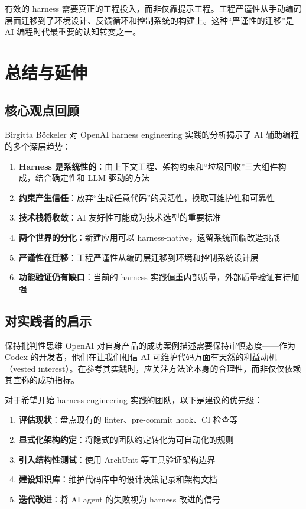 \documentclass[a4paper]{article}
\begin{document}
有效的 harness 需要真正的工程投入，而非仅靠提示工程。工程严谨性从手动编码层面迁移到了环境设计、反馈循环和控制系统的构建上。这种``严谨性的迁移''是 AI 编程时代最重要的认知转变之一。

\newpage

\section{总结与延伸}

\subsection{核心观点回顾}

Birgitta B\"{o}ckeler 对 OpenAI harness engineering 实践的分析揭示了 AI 辅助编程的多个深层趋势：

\begin{enumerate}[leftmargin=1.5em]
    \item \textbf{Harness 是系统性的}：由上下文工程、架构约束和``垃圾回收''三大组件构成，结合确定性和 LLM 驱动的方法
    \item \textbf{约束产生信任}：放弃``生成任意代码''的灵活性，换取可维护性和可靠性
    \item \textbf{技术栈将收敛}：AI 友好性可能成为技术选型的重要标准
    \item \textbf{两个世界的分化}：新建应用可以 harness-native，遗留系统面临改造挑战
    \item \textbf{严谨性在迁移}：工程严谨性从编码层迁移到环境和控制系统设计层
    \item \textbf{功能验证仍有缺口}：当前的 harness 实践偏重内部质量，外部质量验证有待加强
\end{enumerate}

\subsection{对实践者的启示}

\begin{warningbox}{保持批判性思维}
OpenAI 对自身产品的成功案例描述需要保持审慎态度------作为 Codex 的开发者，他们在让我们相信 AI 可维护代码方面有天然的利益动机（vested interest）。在参考其实践时，应关注方法论本身的合理性，而非仅仅依赖其宣称的成功指标。
\end{warningbox}

对于希望开始 harness engineering 实践的团队，以下是建议的优先级：

\begin{enumerate}[leftmargin=1.5em]
    \item \textbf{评估现状}：盘点现有的 linter、pre-commit hook、CI 检查等
    \item \textbf{显式化架构约定}：将隐式的团队约定转化为可自动化的规则
    \item \textbf{引入结构性测试}：使用 ArchUnit 等工具验证架构边界
    \item \textbf{建设知识库}：维护代码库中的设计决策记录和架构文档
    \item \textbf{迭代改进}：将 AI agent 的失败视为 harness 改进的信号
\end{enumerate}
\end{document}
